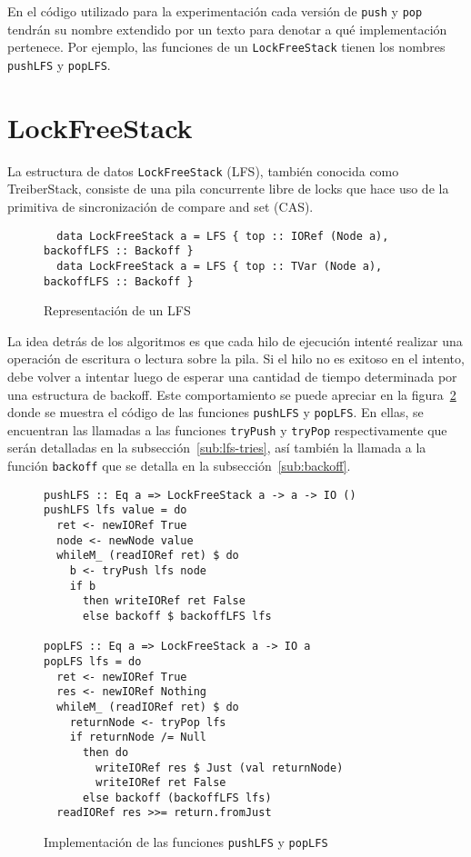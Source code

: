 En el código utilizado para la experimentación cada versión de \texttt{push} y \texttt{pop} tendrán su nombre extendido por un texto para denotar a qué implementación pertenece. Por ejemplo, las funciones de un \texttt{LockFreeStack} tienen los nombres \texttt{pushLFS} y \texttt{popLFS}.

\section{LockFreeStack}\label{sec:lfs}
La estructura de datos \texttt{LockFreeStack} (LFS), también conocida como TreiberStack, consiste de una pila concurrente libre de locks que hace uso de la primitiva de sincronización de compare and set (CAS).

\begin{figure}[H]
  \centering
  \begin{verbatim}
  data LockFreeStack a = LFS { top :: IORef (Node a), backoffLFS :: Backoff }
  data LockFreeStack a = LFS { top :: TVar (Node a), backoffLFS :: Backoff }
  \end{verbatim}
  \caption{Representación de un LFS}
  \label{repLFS}
\end{figure}

La idea detrás de los algoritmos es que cada hilo de ejecución intenté realizar una operación de escritura o lectura sobre la pila. Si el hilo no es exitoso en el intento, debe volver a intentar luego de esperar una cantidad de tiempo determinada por una estructura de backoff. Este comportamiento se puede apreciar en la figura~\ref{fig:lfs-push-pop} donde se muestra el código de las funciones \texttt{pushLFS} y \texttt{popLFS}. En ellas, se encuentran las llamadas a las funciones \texttt{tryPush} y \texttt{tryPop} respectivamente que serán detalladas en la subsección~\ref{sub:lfs-tries}, así también la llamada a la función \texttt{backoff} que se detalla en la subsección~\ref{sub:backoff}.

\begin{figure}[H]
  \centering
  \begin{verbatim}
pushLFS :: Eq a => LockFreeStack a -> a -> IO ()
pushLFS lfs value = do
  ret <- newIORef True
  node <- newNode value
  whileM_ (readIORef ret) $ do
    b <- tryPush lfs node
    if b
      then writeIORef ret False
      else backoff $ backoffLFS lfs

popLFS :: Eq a => LockFreeStack a -> IO a
popLFS lfs = do
  ret <- newIORef True
  res <- newIORef Nothing
  whileM_ (readIORef ret) $ do
    returnNode <- tryPop lfs
    if returnNode /= Null
      then do
        writeIORef res $ Just (val returnNode)
        writeIORef ret False
      else backoff (backoffLFS lfs)
  readIORef res >>= return.fromJust
  \end{verbatim}
  \caption{Implementación de las funciones \texttt{pushLFS} y \texttt{popLFS}}
  \label{fig:lfs-push-pop}
\end{figure}

